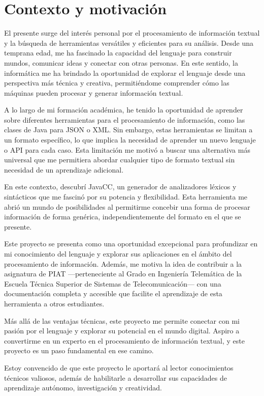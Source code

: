 \section{Contexto y motivación}
El presente \pfg surge del interés personal por el procesamiento de información textual y la búsqueda de herramientas versátiles y eficientes para su análisis. Desde una temprana edad, me ha fascinado la capacidad del lenguaje para construir mundos, comunicar ideas y conectar con otras personas. En este sentido, la informática me ha brindado la oportunidad de explorar el lenguaje desde una perspectiva más técnica y creativa, permitiéndome comprender cómo las máquinas pueden procesar y generar información textual.

A lo largo de mi formación académica, he tenido la oportunidad de aprender sobre diferentes herramientas para el procesamiento de información, como las clases de Java para JSON o XML. Sin embargo, estas herramientas se limitan a un formato específico, lo que implica la necesidad de aprender un nuevo lenguaje o API para cada caso. Esta limitación me motivó a buscar una alternativa más universal que me permitiera abordar cualquier tipo de formato textual sin necesidad de un aprendizaje adicional.

En este contexto, descubrí JavaCC, un generador de analizadores léxicos y sintácticos que me fascinó por su potencia y flexibilidad\cite{javaccgithub}. Esta herramienta me abrió un mundo de posibilidades al permitirme concebir una forma de procesar información de forma genérica, independientemente del formato en el que se presente.

Este proyecto se presenta como una oportunidad excepcional para profundizar en mi conocimiento del lenguaje y explorar sus aplicaciones en el ámbito del procesamiento de información. Además, me motiva la idea de contribuir a la asignatura de PIAT ---perteneciente al Grado en Ingeniería Telemática de la Escuela Técnica Superior de Sistemas de Telecomunicación--- con una documentación completa y accesible que facilite el aprendizaje de esta herramienta a otros estudiantes.

Más allá de las ventajas técnicas, este proyecto me permite conectar con mi pasión por el lenguaje y explorar su potencial en el mundo digital. Aspiro a convertirme en un experto en el procesamiento de información textual, y este proyecto es un paso fundamental en ese camino.

Estoy convencido de que este proyecto le aportará al lector conocimientos técnicos valiosos, además de habilitarle a desarrollar sus capacidades de aprendizaje autónomo, investigación y creatividad. 

